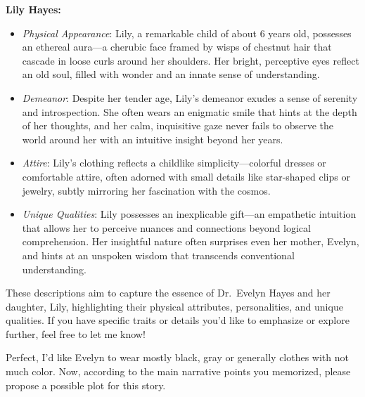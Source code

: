 \begin{aquote}
    \noindent\textbf{Lily Hayes:}
    \begin{itemize}
        \item \emph{Physical Appearance}: Lily, a remarkable child of about 6 years old, possesses an ethereal aura—a cherubic face framed by wisps of chestnut hair that cascade in loose curls around her shoulders. Her bright, perceptive eyes reflect an old soul, filled with wonder and an innate sense of understanding.
        \item \emph{Demeanor}: Despite her tender age, Lily's demeanor exudes a sense of serenity and introspection. She often wears an enigmatic smile that hints at the depth of her thoughts, and her calm, inquisitive gaze never fails to observe the world around her with an intuitive insight beyond her years.
        \item \emph{Attire}: Lily's clothing reflects a childlike simplicity—colorful dresses or comfortable attire, often adorned with small details like star-shaped clips or jewelry, subtly mirroring her fascination with the cosmos.
        \item \emph{Unique Qualities}: Lily possesses an inexplicable gift—an empathetic intuition that allows her to perceive nuances and connections beyond logical comprehension. Her insightful nature often surprises even her mother, Evelyn, and hints at an unspoken wisdom that transcends conventional understanding.
    \end{itemize}
    These descriptions aim to capture the essence of Dr.~Evelyn Hayes and her daughter, Lily, highlighting their physical attributes, personalities, and unique qualities. If you have specific traits or details you'd like to emphasize or explore further, feel free to let me know!
\end{aquote}

\begin{qquote}
    Perfect, I'd like Evelyn to wear mostly black, gray or generally clothes with not much color. Now, according to the main narrative points you memorized, please propose a possible plot for this story.
\end{qquote}

